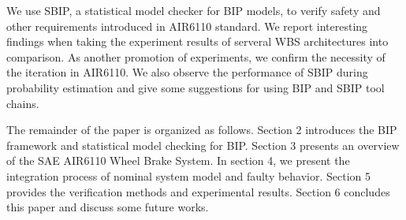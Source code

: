 We use SBIP\cite{sbip18}, a statistical model checker for BIP models, to verify safety and other requirements introduced in AIR6110 standard. We report interesting findings when taking the experiment results of serveral WBS architectures into comparison. As another promotion of experiments, we confirm the necessity of the iteration in AIR6110. We also observe the performance of SBIP during probability estimation and give some suggestions for using BIP and SBIP tool chains.

 The remainder of the paper is organized as follows. Section 2 introduces the BIP framework and statistical model checking for BIP. 
 Section 3 presents an overview of the SAE AIR6110 Wheel Brake System. 
 In section 4, we present the integration process of nominal system model and faulty behavior. 
 Section 5 provides the verification methods and experimental results. 
 Section 6 concludes this paper and discuss some future works.
